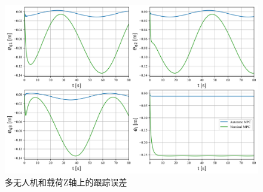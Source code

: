 \documentclass[lang=chs, degree=master, blindreview=false, winfonts=true]{yanputhesis}
\begin{document}
\begin{figure}[H]
	\centering
	\includegraphics[width=38pc]{picture/kk2/ez.png} 
	\caption{多无人机和载荷Z轴上的跟踪误差} 
	\label{ez}
\end{figure}
\end{document}
